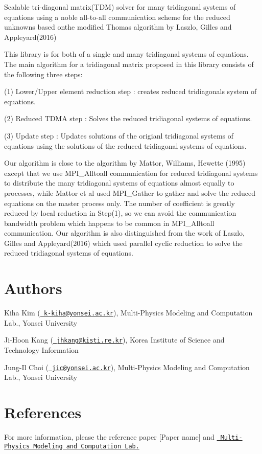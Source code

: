 Scalable tri-\/diagonal matrix(\+T\+D\+M) solver for many tridiagonal systems of equations using a noble all-\/to-\/all communication scheme for the reduced unknowns based onthe modified Thomas algorithm by Laszlo, Gilles and Appleyard(2016)

This library is for both of a single and many tridiagonal systems of equations. The main algorithm for a tridiagonal matrix proposed in this library consists of the following three steps\+:
\begin{DoxyItemize}
\item (1) Lower/\+Upper element reduction step \+: creates reduced tridiagonals system of equations.
\item (2) Reduced T\+D\+MA step \+: Solves the reduced tridiagonal systems of equations.
\item (3) Update step \+: Updates solutions of the origianl tridiagonal systems of equations using the solutions of the reduced tridiagonal systems of equations.
\end{DoxyItemize}

Our algorithm is close to the algorithm by Mattor, Williams, Hewette (1995) except that we use M\+P\+I\+\_\+\+Alltoall communication for reduced tridiagonal systems to distribute the many tridiagonal systems of equations almost equally to processes, while Mattor et al used M\+P\+I\+\_\+\+Gather to gather and solve the reduced equations on the master process only. The number of coefficient is greatly reduced by local reduction in Step(1), so we can avoid the communication bandwidth problem which happens to be common in M\+P\+I\+\_\+\+Alltoall communication. Our algorithm is also distinguished from the work of Laszlo, Gilles and Appleyard(2016) which used parallel cyclic reduction to solve the reduced tridiagonal systems of equations.

\section*{Authors}


\begin{DoxyItemize}
\item Kiha Kim (\href{mailto:k-kiha@yonsei.ac.kr}{\texttt{ k-\/kiha@yonsei.\+ac.\+kr}}), Multi-\/\+Physics Modeling and Computation Lab., Yonsei University
\item Ji-\/\+Hoon Kang (\href{mailto:jhkang@kisti.re.kr}{\texttt{ jhkang@kisti.\+re.\+kr}}), Korea Institute of Science and Technology Information
\item Jung-\/\+Il Choi (\href{mailto:jic@yonsei.ac.kr}{\texttt{ jic@yonsei.\+ac.\+kr}}), Multi-\/\+Physics Modeling and Computation Lab., Yonsei University
\end{DoxyItemize}

\section*{References}

For more information, please the reference paper \mbox{[}Paper name\mbox{]} and \href{https://www.mpmc.yonsei.ac.kr/}{\texttt{ Multi-\/\+Physics Modeling and Computation Lab.}} 
